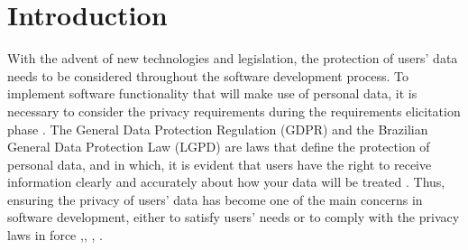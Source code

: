 \documentclass[conference]{IEEEtran}
\begin{document}
\section{Introduction}


With the advent of new technologies and legislation, the protection of users' data needs to be considered throughout the software development process. To implement software functionality that will make use of personal data, it is necessary to consider the privacy requirements during the requirements elicitation phase \cite{DBLP:conf/wer/NettoPS19}. The General Data Protection Regulation (GDPR) \cite{Eu2019} and the Brazilian General Data Protection Law (LGPD) \cite{leiLGPD} are laws that define the protection of personal data, and in which, it is evident that users have the right to receive information clearly and accurately about how your data will be treated \cite{DBLP:conf/re/Ayala-RiveraP18}. Thus, ensuring the privacy of users' data has become one of the main concerns in software development, either to satisfy users' needs or to comply with the privacy laws in force \cite{DBLP:conf/sbes/PeixotoS18},\cite{DBLP:conf/wer/NettoPS19}, \cite{DBLP:conf/amcis/HuthM19}, \cite{DBLP:conf/IEEEares/HorakSH19}.

\end{document}
